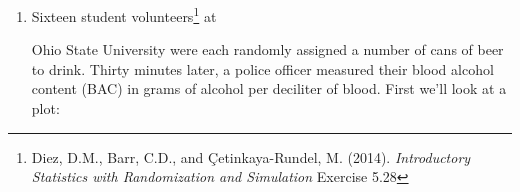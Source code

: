 \begin{enumerate}
\begin{enumerate}
\item Interpret the intercept estimate. Does its sign make sense?
\begin{students}
 \vspace{2cm}\\
\end{students}

\begin{key}
  {\it A person who has had 0 beers is estimated have BAC of -0.013
    g/dl, which does not make sense. We cannot have negative alcohol
    content in our systems. The SE of this estimate is 0.0123, so it
    is only 1 SE below zero.}
\end{key}


\end{enumerate}


\item Sixteen student volunteers\footnote{ Diez, D.M., Barr, C.D., and
    \c{C}etinkaya-Rundel, M. (2014). {\it Introductory Statistics with
    Randomization and Simulation}
     Exercise 5.28}  at \vspace{-.2in}\\ 
  \begin{minipage}{.35\linewidth}
   Ohio State University were each
  randomly assigned a number of cans of beer to drink.  Thirty minutes
  later, a police officer measured their blood alcohol 
  content (BAC) in grams of alcohol per deciliter of blood. 
  First we'll look at a plot: \vspace*{1in}


\end{minipage}
\end{enumerate}
